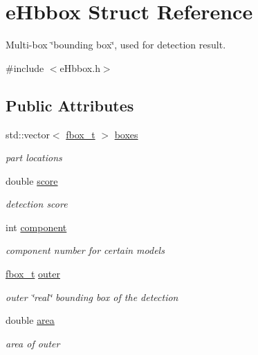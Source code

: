 \hypertarget{structeHbbox}{\section{e\-Hbbox Struct Reference}
\label{structeHbbox}
}


Multi-\/box \char`\"{}bounding box\char`\"{}, used for detection result.  




{\ttfamily \#include $<$e\-Hbbox.\-h$>$}

\subsection*{Public Attributes}
\begin{DoxyCompactItemize}
\item 
\hypertarget{structeHbbox_a2024e52994a0824e9392fd5f9743b947}{std\-::vector$<$ \hyperlink{eHbox_8h_a5a56d87a649d81945e96505ec76d6c54}{fbox\-\_\-t} $>$ \hyperlink{structeHbbox_a2024e52994a0824e9392fd5f9743b947}{boxes}}\label{structeHbbox_a2024e52994a0824e9392fd5f9743b947}

\begin{DoxyCompactList}\small\item\em part locations \end{DoxyCompactList}\item 
double \hyperlink{structeHbbox_a90d1b31a19d0facdeb4caaaba11af54d}{score}
\begin{DoxyCompactList}\small\item\em detection score \end{DoxyCompactList}\item 
\hypertarget{structeHbbox_a7c6a5e808464ba2420a4b43461a5153e}{int \hyperlink{structeHbbox_a7c6a5e808464ba2420a4b43461a5153e}{component}}\label{structeHbbox_a7c6a5e808464ba2420a4b43461a5153e}

\begin{DoxyCompactList}\small\item\em component number for certain models \end{DoxyCompactList}\item 
\hypertarget{structeHbbox_aecbaeae671315bf36d947c7fd22ed633}{\hyperlink{eHbox_8h_a5a56d87a649d81945e96505ec76d6c54}{fbox\-\_\-t} \hyperlink{structeHbbox_aecbaeae671315bf36d947c7fd22ed633}{outer}}\label{structeHbbox_aecbaeae671315bf36d947c7fd22ed633}

\begin{DoxyCompactList}\small\item\em outer \char`\"{}real\char`\"{} bounding box of the detection \end{DoxyCompactList}\item 
\hypertarget{structeHbbox_a8094fe8d4e59fb995b72f2fac8277cc7}{double \hyperlink{structeHbbox_a8094fe8d4e59fb995b72f2fac8277cc7}{area}}\label{structeHbbox_a8094fe8d4e59fb995b72f2fac8277cc7}

\begin{DoxyCompactList}\small\item\em area of outer \end{DoxyCompactList}\end{DoxyCompactItemize}


